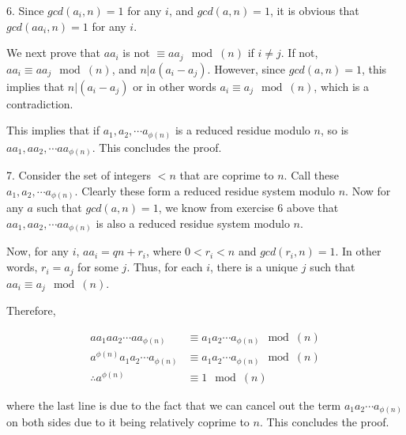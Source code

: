 \documentclass{article}
\begin{document}
6. Since $gcd(a_i, n) = 1$ for any $i$, and $gcd(a, n) = 1$, it is obvious that $gcd(aa_i, n) = 1$ for any $i$.

We next prove that $aa_i$ is not $\equiv aa_j \mod(n)$ if $i \ne j$. If not, $aa_i \equiv aa_j \mod(n)$, and $n | a(a_i - a_j)$. However, since $gcd(a, n) = 1$, this implies that $n | (a_i - a_j)$ or in other words $a_i \equiv a_j \mod(n)$, which is a contradiction.

This implies that if $a_1, a_2, \cdots a_{\phi(n)}$ is a reduced residue modulo $n$, so is $aa_1, aa_2, \cdots aa_{\phi(n)}$. This concludes the proof.

7. Consider the set of integers $< n$ that are coprime to $n$. Call these $a_1, a_2, \cdots a_{\phi(n)}$. Clearly these form a reduced residue system modulo $n$. Now for any $a$ such that $gcd(a, n) = 1$, we know from exercise 6 above that $aa_1, aa_2, \cdots aa_{\phi(n)}$ is also a reduced residue system modulo $n$.

Now, for any $i$, $aa_i = qn + r_i$, where $0 < r_i < n$ and $gcd(r_i, n) = 1$. In other words, $r_i = a_j$ for some $j$. Thus, for each $i$, there is a unique $j$ such that $aa_i \equiv a_j \mod(n)$.

Therefore,

\begin{align*}
    aa_1 aa_2 \cdots aa_{\phi(n)} & \equiv a_1 a_2 \cdots a_{\phi(n)} \mod(n) \\
    a^{\phi(n)} a_1 a_2 \cdots a_{\phi(n)} & \equiv a_1 a_2 \cdots a_{\phi(n)} \mod(n) \\
    \therefore a^{\phi(n)} & \equiv 1 \mod(n)
\end{align*}

where the last line is due to the fact that we can cancel out the term $a_1 a_2 \cdots a_{\phi(n)}$ on both sides due to it being relatively coprime to $n$. This concludes the proof. 
\end{document}
